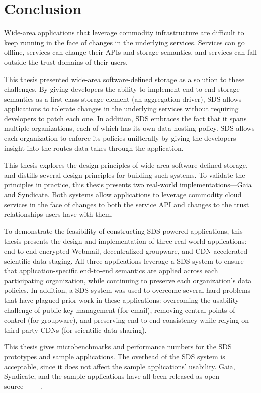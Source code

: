 \chapter{Conclusion}
\label{chap:conclusion}

Wide-area applications that leverage commodity infrastructure are difficult to
keep running in the face of changes in the underlying services.  Services can go
offline, services can change their APIs and storage semantics, and services can
fall outside the trust domains of their users.

This thesis presented wide-area software-defined storage as a solution to these
challenges.  By giving developers the ability to implement end-to-end
storage semantics as a first-class
storage element (an aggregation driver),
SDS allows applications to tolerate changes in the underlying
services without requiring developers to patch each one.
In addition, SDS embraces the fact that it spans multiple organizations, each of
which has its own data hosting policy.  SDS allows each organization to enforce
its policies unilterally by giving the developers insight into the routes data
takes through the application.

This thesis explores the design principles of wide-area software-defined storage, and
distills several design principles for building such systems.  To validate the
principles in practice, this thesis presents two real-world
implementations---Gaia and Syndicate.  Both systems allow applications to
leverage commodity cloud services in the face of changes to both the service API
and changes to the trust relationships users have with them.

To demonstrate the feasibility of constructing SDS-powered applications, 
this thesis presents the design and implementation of three real-world applications:
end-to-end encrypted Webmail, decentralized groupware, and CDN-accelerated
scientific data staging.  All three applications leverage a SDS system to ensure
that application-specific end-to-end semantics are applied across each
participating organization, while continuing to preserve each organization's
data policies.  In addition, a SDS system was used to overcome several hard
problems that have plagued prior work in these applications:
overcoming the usability challenge of public key management (for email),
removing central points of control (for groupware), and preserving end-to-end
consistency while relying on third-party CDNs (for scientific data-sharing).

This thesis gives microbenchmarks and performance numbers for the SDS prototypes and
sample applications.  The overhead of the SDS system is acceptable,
since it does not affect the sample applications' usability.
Gaia, Syndicate, and the sample applications have all been released as
open-source~\cite{blockstack-core}~\cite{syndicate-storage}~\cite{syndicatemail}~\cite{blockstack-todo}~\cite{blockstack-browser}.

